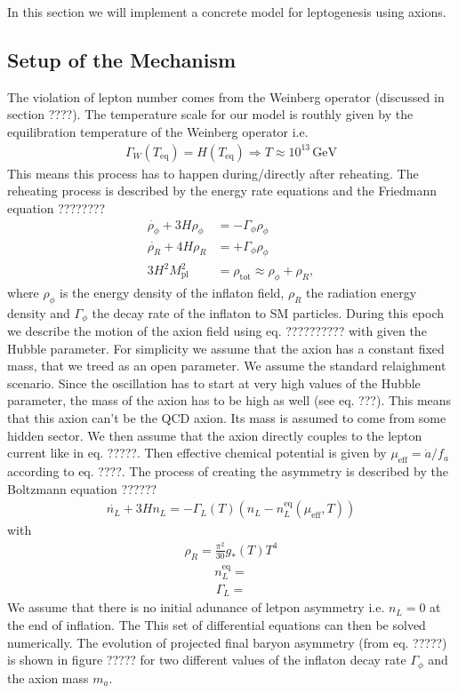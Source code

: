 \documentclass[13pt,a4paper,twoside,titlepage]{article}
\begin{document}

In this section we will implement a concrete model for leptogenesis using axions.

\subsection{Setup of the Mechanism}
The violation of lepton number comes from the Weinberg operator (discussed in section ????).
The temperature scale for our model is routhly given by the equilibration temperature of the Weinberg operator i.e.
\begin{align}
    \Gamma_W(T_\mathrm{eq}) = H(T_\mathrm{eq}) \Rightarrow T \approx 10^{13} \, \mathrm{GeV}
\end{align}
This means this process has to happen during/directly after reheating. The reheating process is described by the energy rate equations and the Friedmann equation ????????
\begin{align}
    \dot{\rho_\phi} + 3 H \rho_\phi &= - \Gamma_\phi \rho_\phi \\
    \dot{\rho_R} + 4 H \rho_R &= + \Gamma_\phi \rho_\phi \\
    3 H^2 M_\mathrm{pl}^2 &= \rho_\mathrm{tot} \approx \rho_\phi + \rho_R,
\end{align}
where $\rho_\phi$ is the energy density of the inflaton field, $\rho_R$ the radiation energy density and $\Gamma_\phi$ the decay rate of the inflaton to SM particles.
During this epoch we describe the motion of the axion field using eq. ?????????? with given the Hubble parameter.
For simplicity we assume that the axion has a constant fixed mass, that we treed as an open parameter. We assume the standard relaighment scenario. Since the oscillation has to start at very high values of the Hubble parameter, the mass of the axion has to be high as well (see eq. ???).
This means that this axion can't be the QCD axion. Its mass is assumed to come from some hidden sector.
We then assume that the axion directly couples to the lepton current like in eq. ?????. Then effective chemical potential is given by $\mu_\mathrm{eff} = \dot{a}/f_a$ according to eq. ????.
The process of creating the asymmetry is described by the Boltzmann equation ??????
\begin{align}
    \dot{n_L} + 3 H n_L = - \Gamma_L(T) (n_L - n_L^\mathrm{eq}(\mu_\mathrm{eff}, T))
\end{align}
with
\begin{align}
    \rho_R = \frac{\pi^2}{30} g_{*}(T) T^4
\end{align}
\begin{align}
    n_L^\mathrm{eq} =
\end{align}
\begin{align}
    \Gamma_L =
\end{align}
We assume that there is no initial adunance of letpon asymmetry i.e. $n_L = 0$ at the end of inflation.
The
This set of differential equations can then be solved numerically. The evolution of projected final baryon asymmetry (from eq. ?????) is shown in figure ????? for two different values of the inflaton decay rate $\Gamma_\phi$ and the axion mass $m_a$.
\end{document}
